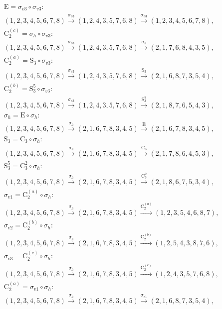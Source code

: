 \begin{align*}
& \mathrm{E} = \sigma_{v3} \circ \sigma_{v3}:\; \\& (1,2,3,4,5,6,7,8) \xrightarrow{\sigma_{v3}} (1,2,4,3,5,7,6,8) \xrightarrow{\sigma_{v3}} (1,2,3,4,5,6,7,8), \\
& \mathrm{C}_{2}^{(c)} = \sigma_{h} \circ \sigma_{v3}:\; \\& (1,2,3,4,5,6,7,8) \xrightarrow{\sigma_{v3}} (1,2,4,3,5,7,6,8) \xrightarrow{\sigma_{h}} (2,1,7,6,8,4,3,5), \\
& \mathrm{C}_{2}^{(a)} = \mathrm{S}_{3} \circ \sigma_{v3}:\; \\& (1,2,3,4,5,6,7,8) \xrightarrow{\sigma_{v3}} (1,2,4,3,5,7,6,8) \xrightarrow{\mathrm{S}_{3}} (2,1,6,8,7,3,5,4), \\
& \mathrm{C}_{2}^{(b)} = \mathrm{S}_{3}^{5} \circ \sigma_{v3}:\; \\& (1,2,3,4,5,6,7,8) \xrightarrow{\sigma_{v3}} (1,2,4,3,5,7,6,8) \xrightarrow{\mathrm{S}_{3}^{5}} (2,1,8,7,6,5,4,3), \\
& \sigma_{h} = \mathrm{E} \circ \sigma_{h}:\; \\& (1,2,3,4,5,6,7,8) \xrightarrow{\sigma_{h}} (2,1,6,7,8,3,4,5) \xrightarrow{\mathrm{E}} (2,1,6,7,8,3,4,5), \\
& \mathrm{S}_{3} = \mathrm{C}_{3} \circ \sigma_{h}:\; \\& (1,2,3,4,5,6,7,8) \xrightarrow{\sigma_{h}} (2,1,6,7,8,3,4,5) \xrightarrow{\mathrm{C}_{3}} (2,1,7,8,6,4,5,3), \\
& \mathrm{S}_{3}^{5} = \mathrm{C}_{3}^{2} \circ \sigma_{h}:\; \\& (1,2,3,4,5,6,7,8) \xrightarrow{\sigma_{h}} (2,1,6,7,8,3,4,5) \xrightarrow{\mathrm{C}_{3}^{2}} (2,1,8,6,7,5,3,4), \\
& \sigma_{v1} = \mathrm{C}_{2}^{(a)} \circ \sigma_{h}:\; \\& (1,2,3,4,5,6,7,8) \xrightarrow{\sigma_{h}} (2,1,6,7,8,3,4,5) \xrightarrow{\mathrm{C}_{2}^{(a)}} (1,2,3,5,4,6,8,7), \\
& \sigma_{v2} = \mathrm{C}_{2}^{(b)} \circ \sigma_{h}:\; \\& (1,2,3,4,5,6,7,8) \xrightarrow{\sigma_{h}} (2,1,6,7,8,3,4,5) \xrightarrow{\mathrm{C}_{2}^{(b)}} (1,2,5,4,3,8,7,6), \\
& \sigma_{v3} = \mathrm{C}_{2}^{(c)} \circ \sigma_{h}:\; \\& (1,2,3,4,5,6,7,8) \xrightarrow{\sigma_{h}} (2,1,6,7,8,3,4,5) \xrightarrow{\mathrm{C}_{2}^{(c)}} (1,2,4,3,5,7,6,8), \\
& \mathrm{C}_{2}^{(a)} = \sigma_{v1} \circ \sigma_{h}:\; \\& (1,2,3,4,5,6,7,8) \xrightarrow{\sigma_{h}} (2,1,6,7,8,3,4,5) \xrightarrow{\sigma_{v1}} (2,1,6,8,7,3,5,4), \\

\end{align*}
